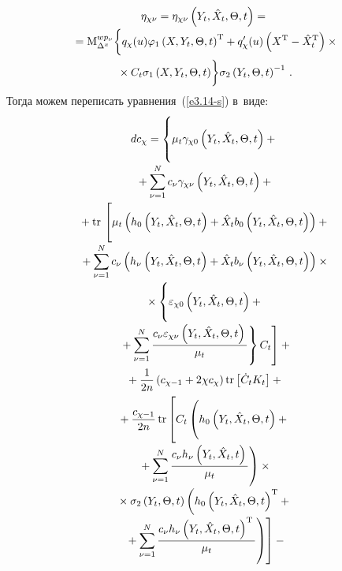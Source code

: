 \begin{multicols}{2}
    \vspace*{-12pt}
   
   \noindent
    \begin{multline*}
    \eta_{\chi \nu} =
    \eta_{\chi \nu} \left(Y_t,\hat X_t,\Theta,t\right) ={}\\[-2pt]
    {}=
    {\rm M}_{\Delta^x}^{w p_\nu} \biggl\{ q_\chi(u) \varphi_1 
    \left(X,Y_t,\Theta,t\right)^{\mathrm{T}} + 
    q_\chi' (u)\left(X^{\mathrm{T}}-\hat X_t^{\mathrm{T}}\right)\times{}\hspace*{-1.52713pt}\\
{}\times C_t \sigma_1 \left(X,Y_t,\Theta,t\right)\biggr\} 
\sigma_2 \left(Y_t,\Theta,t\right)^{-1}\,.
\end{multline*}
Тогда можем переписать уравнения~(\ref{e3.14-s}) в~виде:
\begin{multline*}
d c_\chi =\left\{
\vphantom{\left(\fr{b_nu\left(Y_t, \hat{X}_t\right)^T}{\mu_t}\right)}
    \mu_t\gamma_{\chi 0} \left(Y_t,\hat X_t,\Theta,t\right) + {}\right.\\[-2pt]
    {}+
    \sss_{\nu=1}^N c_\nu \gamma_{\chi\nu} \left(Y_t,\hat X_t,\Theta,t\right)+{}\\[-2pt]
{}+ \mathrm{tr}\,\left[ 
\vphantom{\fr{ c_\nu \varepsilon_{\chi\nu}
    \left(Y_t,\hat X_t,\Theta,t\right)}{\mu_t}} 
\mu_t\left(h_0 \left(Y_t,\hat X_t,\Theta,t\right)+\hat X_t b_0 \left(Y_t,\hat
    X_t,\Theta,t\right)\right)+{}\right.\\[-2pt]
{}+\sss_{\nu=1}^N c_\nu \left(h_\nu \left(Y_t,\hat X_t,\Theta,t\right) +\hat X_t
    b_\nu \left(Y_t,\hat X_t,\Theta,t\right)\right)\times{}\\[-2pt]
{}\times \left\{ 
\vphantom{\fr{ c_\nu \varepsilon_{\chi\nu}
    \left(Y_t,\hat X_t,\Theta,t\right)}{\mu_t}}
    \varepsilon_{\chi 0}
    \left(Y_t,\hat X_t,\Theta,t\right) +{}\right.\\[-2pt]
\left.\left.    {}+
    \sss_{\nu=1}^N \fr{ c_\nu \varepsilon_{\chi\nu}
    \left(Y_t,\hat X_t,\Theta,t\right)}{\mu_t}\right\} C_t\right]+{}\\[-2pt]
    {}+ \fr{1}{2n} \left(c_{\chi-1} +2\chi c_\chi\right)\mathrm{tr} \left[ \dot C_t
    K_t\right]+{}\\[-2pt]
    {}+ \fr{c_{\chi-1}}{2n}\,\mathrm{tr} \left[ 
\vphantom{\fr{c_\nu h_\nu \left(Y_t,\hat
    X_t,\Theta,t\right)^{\mathrm{T}}}{\mu_t}}
C_t\left(
\vphantom{\fr{c_\nu h_\nu \left(Y_t,\hat
    X_t,t\right)}{\mu_t}}
h_0
    \left(Y_t,\hat X_t,\Theta,t\right)+{}\right.\right.\\[-2pt]
    \left. {}+\sss_{\nu=1}^N \fr{c_\nu h_\nu \left(Y_t,\hat
    X_t,t\right)}{\mu_t}\right) \times{}\\[-2pt]
    {}\times
     \sigma_2 \left(Y_t,\Theta,t\right)\left( h_0 \left(Y_t,\hat
    X_t,\Theta,t\right)^{\mathrm{T}}+{}\right.\\[-2pt]
    \left.\left.    {}+\sss_{\nu=1}^N \fr{c_\nu h_\nu \left(Y_t,\hat
    X_t,\Theta,t\right)^{\mathrm{T}}}{\mu_t}\right)\right]-{}
        \end{multline*}


\end{multicols}
